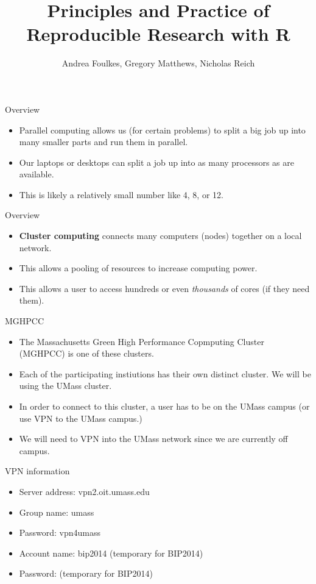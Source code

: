 \documentclass[table]{beamer}\usepackage[]{graphicx}\usepackage[]{color}
\title{Principles and Practice of Reproducible Research with R}
\author{Andrea Foulkes, Gregory Matthews, Nicholas Reich}
\begin{document}
\begin{frame}[plain]
	\titlepage
\end{frame}

\begin{frame}{Overview}
\begin{itemize}
\item Parallel computing allows us (for certain problems) to split a big job up into many smaller parts and run them in parallel.  
\item Our laptops or desktops can split a job up into as many processors as are available.  
\item This is likely a relatively small number like 4, 8, or 12. 
 \end{itemize}
\end{frame}

\begin{frame}{Overview}
\begin{itemize}
\item {\bf Cluster computing} connects many computers (nodes) together on a local network. 
\item This allows a pooling of resources to increase computing power.
\item This allows a user to access hundreds or even {\it thousands} of cores (if they need them). 
\end{itemize}
\end{frame}

\begin{frame}{MGHPCC}
\begin{itemize}
\item The Massachusetts Green High Performance Copmputing Cluster (MGHPCC) is one of these clusters.  
\item Each of the participating instiutions has their own distinct cluster. We will be using the UMass cluster.
\item In order to connect to this cluster, a user has to be on the UMass campus (or use VPN to the UMass campus.)
\item We will need to VPN into the UMass network since we are currently off campus.  
\end{itemize}
\end{frame}

\begin{frame}{VPN information}
\begin{itemize}
\item Server address: vpn2.oit.umass.edu 
\item Group name: umass
\item Password: vpn4umass
\item Account name: bip2014 (temporary for BIP2014)
\item Password:  (temporary for BIP2014)
\end{itemize}
\end{frame}
\end{document}
